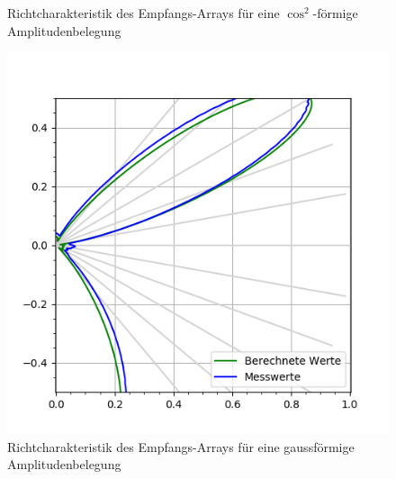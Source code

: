 \begin{figure}[htb]
\begin{minipage}{0.5\textwidth}
\caption{Richtcharakteristik des Empfangs-Arrays für eine $\cos^{2}$-förmige Amplitudenbelegung} %
\label{fig:plot_test_characteristic_receiver_30_deg_send_rect_receive_cos2_6_bursts}
%
\end{minipage}
\begin{minipage}{0.5\textwidth}
\includegraphics[width=\textwidth]{graphics/plot_test_characteristic_receiver_30_deg_send_rect_receive_gauss_6_bursts.png}
\caption{Richtcharakteristik des Empfangs-Arrays für eine gaussförmige Amplitudenbelegung} %
\label{fig:plot_test_characteristic_receiver_30_deg_send_rect_receive_gauss_6_bursts}
%
\end{minipage}
\end{figure}


\clearpage
